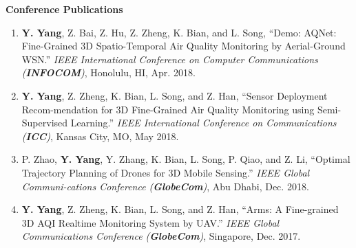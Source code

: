 \documentclass[11pt]{article}
\makeatletter
\newlength{\bibhang}
\newlength{\bibsep}{\@listi \global\bibsep\itemsep \global\advance\bibsep by\parsep}
\newenvironment{bibsection}
    {\begin{enumerate}{}{
        \setlength{\leftmargin}{\bibhang}
        \setlength{\itemindent}{-\leftmargin}
        \setlength{\itemsep}{\bibsep}
        \setlength{\parsep}{\z@}
        \setlength{\partopsep}{0pt}
        \setlength{\topsep}{0pt}}}
    {\end{enumerate}\vspace{-.6\baselineskip}}
\newcommand{\halfblankline}{\quad\vspace{-0.5\baselineskip}\pagebreak[3]}
\makeatother
\begin{document}
\halfblankline

\textbf{Conference Publications}
\vspace{-.03in}
\begin{enumerate}
    \item {\bf Y. Yang}, Z. Bai, Z. Hu, Z. Zheng, K. Bian, and L. Song, ``Demo: AQNet: Fine-Grained 3D Spatio-Temporal Air Quality Monitoring by Aerial-Ground WSN.'' {\em IEEE International Conference on Computer Communications (\textbf{INFOCOM})}, Honolulu, HI, Apr. 2018.
    \item {\bf Y. Yang}, Z. Zheng, K. Bian, L. Song, and Z. Han, ``Sensor Deployment Recom-mendation for 3D Fine-Grained Air Quality Monitoring using Semi-Supervised Learning.'' {\em IEEE International Conference on Communications (\textbf{ICC})}, Kansas City, MO, May 2018.
    \item P. Zhao, {\bf Y. Yang}, Y. Zhang, K. Bian, L. Song, P. Qiao, and Z. Li, ``Optimal Trajectory Planning of Drones for 3D Mobile Sensing.'' {\em IEEE Global Communi-cations Conference (\textbf{GlobeCom})}, Abu Dhabi, Dec. 2018.
    \item {\bf Y. Yang}, Z. Zheng, K. Bian, L. Song, and Z. Han, ``Arms: A Fine-grained 3D AQI Realtime Monitoring System by UAV.'' {\em IEEE Global Communications Conference (\textbf{GlobeCom})}, Singapore, Dec. 2017.
\end{enumerate}

\iffalse
\begin{bibsection}
    \item {\bf Yuzhe Yang}, Zixuan Bai, Zhiwen Hu, Zijie Zheng, Kaigui Bian, and Lingyang Song, ``Demo: AQNet: Fine-Grained 3D Spatio-Temporal Air Quality Monitoring by Aerial-Ground WSN.'' {\em IEEE International Conference on Computer Communications~(\textbf{INFOCOM'18})}, Honolulu, HI, Apr. 2018.
    \item {\bf Yuzhe Yang}, Zijie Zheng, Kaigui Bian, Lingyang Song, and Zhu Han, ``Sensor Deployment Recommendation for 3D Fine-Grained Air Quality Monitoring using Semi-Supervised Learning.'' {\em IEEE International Conference on Communications~(\textbf{ICC'18})}, Kansas City, MO, May 2018.
    \item {\bf Yuzhe Yang}, Zijie Zheng, Kaigui Bian, Yun Jiang, Lingyang Song, and Zhu Han, ``Arms: A Fine-grained 3D AQI Realtime Monitoring System by UAV.'' {\em IEEE Global Communications Conference~(\textbf{GlobeCom'17})}, Singapore, Dec. 2017.
\end{bibsection}
\fi


\iffalse
\end{document}
